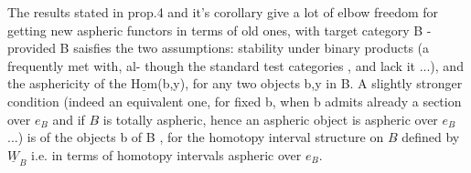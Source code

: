 The results stated in prop.4  and it's corollary give a lot of elbow
freedom for getting new aspheric functors in terms of old ones,  with
target category B  -  provided B saisfies the two assumptions:  
stability under binary products (a  frequently met with,  al-%
though the standard test categories \hand{$\Delta$},\hand{$\Box$} and \hand{\unsure{$\bigcirc$}} lack it ...),  and the
 asphericity of the  $\underline{\mathrm{Hom}}$(b,y),  for any two objects b,y
in B.  A slightly stronger condition (indeed an equivalent one,  for
fixed b,  when b admits already a section over $e_{B\hat{}}$  and if $B\hat{}$ is totally
aspheric,  hence an aspheric object is  aspheric over $e_{B\hat{}}$ ...) is \hand{\uline{\textcolor{black}{contrac-}}}%
\hand{\uline{\textcolor{black}{tibility}}} of the objects b of B ,  for the homotopy interval structure on
$B\hat{}$ defined by $\underline{W}_B$ \hand{(}i.e. in terms of homotopy intervals aspheric over $e_{B\hat{}}$\hand{)}.

